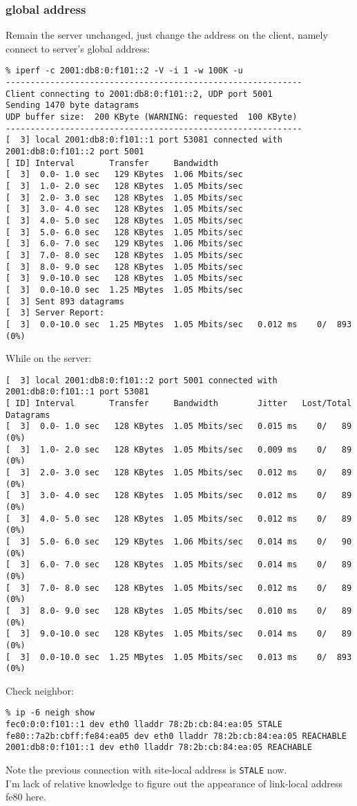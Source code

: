 \documentclass[a4paper]{report}
\begin{document}
\subsubsection{global address}
Remain the server unchanged, just change the address on the client, namely connect
to server's global address:
\begin{lstlisting}
% iperf -c 2001:db8:0:f101::2 -V -i 1 -w 100K -u
------------------------------------------------------------
Client connecting to 2001:db8:0:f101::2, UDP port 5001
Sending 1470 byte datagrams
UDP buffer size:  200 KByte (WARNING: requested  100 KByte)
------------------------------------------------------------
[  3] local 2001:db8:0:f101::1 port 53081 connected with 2001:db8:0:f101::2 port 5001
[ ID] Interval       Transfer     Bandwidth
[  3]  0.0- 1.0 sec   129 KBytes  1.06 Mbits/sec
[  3]  1.0- 2.0 sec   128 KBytes  1.05 Mbits/sec
[  3]  2.0- 3.0 sec   128 KBytes  1.05 Mbits/sec
[  3]  3.0- 4.0 sec   128 KBytes  1.05 Mbits/sec
[  3]  4.0- 5.0 sec   128 KBytes  1.05 Mbits/sec
[  3]  5.0- 6.0 sec   128 KBytes  1.05 Mbits/sec
[  3]  6.0- 7.0 sec   129 KBytes  1.06 Mbits/sec
[  3]  7.0- 8.0 sec   128 KBytes  1.05 Mbits/sec
[  3]  8.0- 9.0 sec   128 KBytes  1.05 Mbits/sec
[  3]  9.0-10.0 sec   128 KBytes  1.05 Mbits/sec
[  3]  0.0-10.0 sec  1.25 MBytes  1.05 Mbits/sec
[  3] Sent 893 datagrams
[  3] Server Report:
[  3]  0.0-10.0 sec  1.25 MBytes  1.05 Mbits/sec   0.012 ms    0/  893 (0%)
\end{lstlisting}
While on the server:
\begin{lstlisting}
[  3] local 2001:db8:0:f101::2 port 5001 connected with 2001:db8:0:f101::1 port 53081
[ ID] Interval       Transfer     Bandwidth        Jitter   Lost/Total Datagrams
[  3]  0.0- 1.0 sec   128 KBytes  1.05 Mbits/sec   0.015 ms    0/   89 (0%)
[  3]  1.0- 2.0 sec   128 KBytes  1.05 Mbits/sec   0.009 ms    0/   89 (0%)
[  3]  2.0- 3.0 sec   128 KBytes  1.05 Mbits/sec   0.012 ms    0/   89 (0%)
[  3]  3.0- 4.0 sec   128 KBytes  1.05 Mbits/sec   0.012 ms    0/   89 (0%)
[  3]  4.0- 5.0 sec   128 KBytes  1.05 Mbits/sec   0.012 ms    0/   89 (0%)
[  3]  5.0- 6.0 sec   129 KBytes  1.06 Mbits/sec   0.014 ms    0/   90 (0%)
[  3]  6.0- 7.0 sec   128 KBytes  1.05 Mbits/sec   0.014 ms    0/   89 (0%)
[  3]  7.0- 8.0 sec   128 KBytes  1.05 Mbits/sec   0.012 ms    0/   89 (0%)
[  3]  8.0- 9.0 sec   128 KBytes  1.05 Mbits/sec   0.010 ms    0/   89 (0%)
[  3]  9.0-10.0 sec   128 KBytes  1.05 Mbits/sec   0.014 ms    0/   89 (0%)
[  3]  0.0-10.0 sec  1.25 MBytes  1.05 Mbits/sec   0.013 ms    0/  893 (0%)
\end{lstlisting}
Check neighbor:
\begin{lstlisting}
% ip -6 neigh show
fec0:0:0:f101::1 dev eth0 lladdr 78:2b:cb:84:ea:05 STALE
fe80::7a2b:cbff:fe84:ea05 dev eth0 lladdr 78:2b:cb:84:ea:05 REACHABLE
2001:db8:0:f101::1 dev eth0 lladdr 78:2b:cb:84:ea:05 REACHABLE
\end{lstlisting}
Note the previous connection with site-local address is {\tt STALE} now.\\
I'm lack of relative knowledge to figure out the appearance of link-local address
fe80 here.
\end{document}
